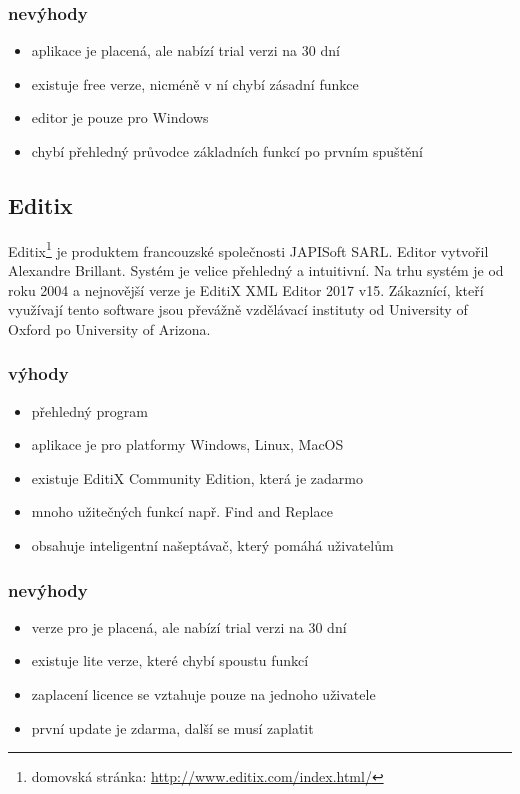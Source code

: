             \subsubsection{nevýhody}
                \begin{itemize}
                    \item aplikace je placená, ale nabízí trial verzi na 30 dní
                    \item existuje free verze, nicméně v ní chybí zásadní funkce
                    \item editor je pouze pro Windows
                    \item chybí přehledný průvodce základních funkcí po prvním spuštění
                \end{itemize}
                
        \subsection{Editix} 
            Editix\footnote{domovská stránka: \url{http://www.editix.com/index.html/}} je produktem francouzské společnosti JAPISoft SARL. Editor vytvořil Alexandre Brillant. Systém je velice přehledný a intuitivní. Na trhu systém je od roku 2004 a nejnovější verze je EditiX XML Editor 2017 v15. Zákaznící, kteří využívají tento software jsou převážně vzdělávací instituty od University of Oxford po University of Arizona.
            
            \subsubsection{výhody}
                \begin{itemize}
                    \item přehledný program
                    \item aplikace je pro platformy Windows, Linux, MacOS	
                    \item existuje EditiX Community Edition, která je zadarmo
                    \item mnoho užitečných funkcí např. Find and Replace
                    \item obsahuje inteligentní našeptávač, který pomáhá uživatelům
                \end{itemize}
                
            \subsubsection{nevýhody}
                \begin{itemize}
                    \item verze pro je placená, ale nabízí trial verzi na 30 dní
                    \item existuje lite verze, které chybí spoustu funkcí
                    \item zaplacení licence se vztahuje pouze na jednoho uživatele
                    \item první update je zdarma, další se musí zaplatit
                \end{itemize}
                
